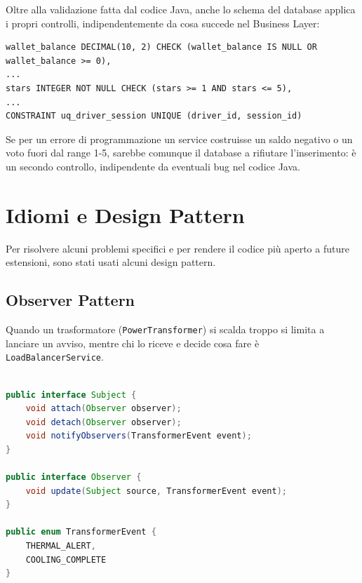 Oltre alla validazione fatta dal codice Java, anche lo schema del database applica i propri controlli, indipendentemente da cosa succede nel Business Layer:

\vspace{0.3cm}
\noindent\begin{minipage}{\linewidth}
\begin{lstlisting}[caption={Vincoli SQL di integrità}]
wallet_balance DECIMAL(10, 2) CHECK (wallet_balance IS NULL OR wallet_balance >= 0),
...
stars INTEGER NOT NULL CHECK (stars >= 1 AND stars <= 5),
...
CONSTRAINT uq_driver_session UNIQUE (driver_id, session_id)
\end{lstlisting}
\end{minipage}
\vspace{0.3cm}

Se per un errore di programmazione un service costruisse un saldo negativo o un voto fuori dal range 1-5, sarebbe comunque il database a rifiutare l'inserimento: è un secondo controllo, indipendente da eventuali bug nel codice Java.

\section{Idiomi e Design Pattern}
\label{ch:pattern}
Per risolvere alcuni problemi specifici e per rendere il codice più aperto a future estensioni, sono stati usati alcuni design pattern.

\subsection{Observer Pattern}
\label{sec: Observer Pattern}
Quando un trasformatore (\texttt{PowerTransformer}) si scalda troppo si limita a lanciare un avviso, mentre chi lo riceve e decide cosa fare è \texttt{LoadBalancerService}.

\vspace{0.3cm}
\noindent\begin{minipage}{\linewidth}
\begin{lstlisting}[language=Java, caption={Interfacce Subject e Observer}]

public interface Subject {
    void attach(Observer observer);
    void detach(Observer observer);
    void notifyObservers(TransformerEvent event);
}

public interface Observer {
    void update(Subject source, TransformerEvent event);
}

public enum TransformerEvent {
    THERMAL_ALERT,
    COOLING_COMPLETE
}

\end{lstlisting}
\end{minipage}
\vspace{0.3cm}

